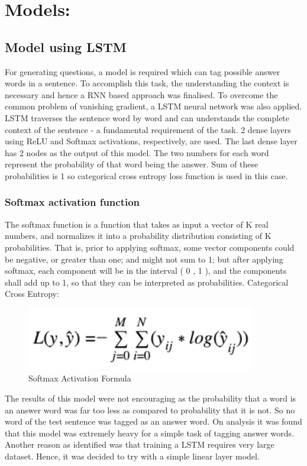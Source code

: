 \section{Models:}

\subsection{Model using LSTM}
For generating questions, a model is required which can tag possible answer
words in a sentence. To accomplish this task, the understanding the context is
necessary and hence a RNN based approach was finalised. To overcome the common
problem of vanishing gradient, a LSTM neural network was also applied. LSTM
traverses the sentence word by word and can understands the complete context of
the sentence - a fundamental requirement of the task. 2 dense layers using ReLU
and Softmax activations, respectively, are used.
The last dense layer has 2 nodes as the output of this model. The two numbers
for each word represent the probability of that word being the answer. Sum of
these probabilities is 1 so categorical cross entropy loss function is used in
this case.

\subsubsection{Softmax activation function}
The softmax function is a function that takes as input a vector of K real
numbers, and normalizes it into a probability distribution consisting of K
probabilities. That is, prior to applying softmax, some vector components could
be negative, or greater than one; and might not sum to 1; but after applying
softmax, each component will be in the interval ( 0 , 1 ), and the components
shall add up to 1, so that they can be interpreted as probabilities.
Categorical Cross Entropy:

\begin{figure}
	\caption{Softmax Activation Formula}
	\centering\includegraphics[width=10cm]{6.png}
\end{figure}

The results of this model were not encouraging as the probability that a word is
an answer word was far too less as compared to probability that it is not. So no
word of the test sentence was tagged as an answer word. On analysis it was found
that this model  was extremely heavy for a simple task of tagging answer words.
Another reason as identified was that training a LSTM requires very large
dataset. Hence, it was decided to try with a simple linear layer model.

